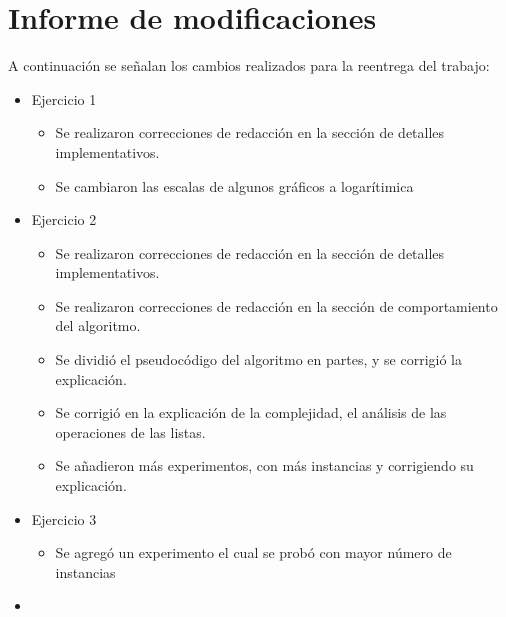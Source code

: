 \section{Informe de modificaciones}

A continuación se señalan los cambios realizados para la reentrega del trabajo:

\begin{itemize}
	\item{
		Ejercicio 1
		\begin{itemize}
			\item Se realizaron correcciones de redacción en la sección de detalles implementativos.
			\item Se cambiaron las escalas de algunos gráficos a logarítimica
		\end{itemize}
	}
	\item{
		Ejercicio 2
		\begin{itemize}
			\item Se realizaron correcciones de redacción en la sección de detalles implementativos.			
			\item Se realizaron correcciones de redacción en la sección de comportamiento del algoritmo.
			\item Se dividió el pseudocódigo del algoritmo en partes, y se corrigió la explicación. 
			\item Se corrigió en la explicación de la complejidad, el análisis de las operaciones de las listas. 
			\item Se añadieron más experimentos, con más instancias y corrigiendo su explicación. 
		\end{itemize}
	}
	\item{
		Ejercicio 3
		\begin{itemize}
			\item Se agregó un experimento el cual se probó con mayor número de instancias
		\end{itemize}
	}
	\item{
}
\end{itemize}
